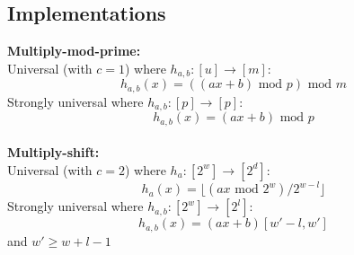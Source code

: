 \documentclass[a4paper]{article}
\begin{document}
\subsection*{Implementations}
\textbf{Multiply-mod-prime:} \\
Universal (with $c=1$) where $h_{a,b}:[u]\rightarrow [m]$:
$$h_{a,b}(x)=((ax+b) \mbox{ mod } p)\mbox{ mod } m$$
Strongly universal where $h_{a,b}:[p]\rightarrow [p]$:
$$h_{a,b}(x)=(ax+b)\mbox{ mod }p$$
\\
\textbf{Multiply-shift:} \\
Universal (with $c=2$) where $h_a:[2^w]\rightarrow [2^d]$:
$$h_a(x)=\lfloor (ax \mbox{ mod } 2^w)/2^{w-l}\rfloor$$
Strongly universal where $h_{a,b}:[2^w]\rightarrow [2^l]$:
$$h_{a,b}(x)=(ax+b)[w'-l, w']$$
and $w'\geq w+l-1$
\end{document}
